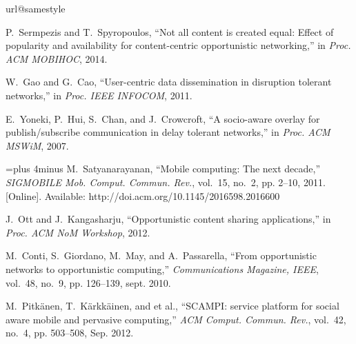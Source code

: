 \documentclass[journal]{IEEEtran}
\begin{document}
\begin{thebibliography}{10}
\providecommand{\url}[1]{#1}
\csname url@samestyle\endcsname
\providecommand{\newblock}{\relax}
\providecommand{\bibinfo}[2]{#2}
\providecommand{\BIBentrySTDinterwordspacing}{\spaceskip=0pt\relax}
\providecommand{\BIBentryALTinterwordstretchfactor}{4}
\providecommand{\BIBentryALTinterwordspacing}{\spaceskip=\fontdimen2\font plus
\BIBentryALTinterwordstretchfactor\fontdimen3\font minus
  \fontdimen4\font\relax}
\providecommand{\BIBforeignlanguage}[2]{{\expandafter\ifx\csname l@#1\endcsname\relax
\typeout{** WARNING: IEEEtran.bst: No hyphenation pattern has been}\typeout{** loaded for the language `#1'. Using the pattern for}\typeout{** the default language instead.}\else
\language=\csname l@#1\endcsname
\fi
#2}}
\providecommand{\BIBdecl}{\relax}
\BIBdecl

P.~Sermpezis and T.~Spyropoulos, ``{N}ot all content is created equal: {E}ffect
  of popularity and availability for content-centric opportunistic
  networking,'' in \emph{Proc. ACM MOBIHOC}, 2014.

W.~Gao and G.~Cao, ``User-centric data dissemination in disruption tolerant
  networks,'' in \emph{Proc. IEEE INFOCOM}, 2011.

E.~Yoneki, P.~Hui, S.~Chan, and J.~Crowcroft, ``A socio-aware overlay for
  publish/subscribe communication in delay tolerant networks,'' in \emph{Proc.
  ACM MSWiM}, 2007.

\BIBentryALTinterwordspacing
M.~Satyanarayanan, ``Mobile computing: The next decade,'' \emph{SIGMOBILE Mob.
  Comput. Commun. Rev.}, vol.~15, no.~2, pp. 2--10, 2011. [Online]. Available:
  \url{http://doi.acm.org/10.1145/2016598.2016600}
\BIBentrySTDinterwordspacing

J.~Ott and J.~Kangasharju, ``Opportunistic content sharing applications,'' in
  \emph{Proc. ACM NoM Workshop}, 2012.

M.~Conti, S.~Giordano, M.~May, and A.~Passarella, ``From opportunistic networks
  to opportunistic computing,'' \emph{Communications Magazine, IEEE}, vol.~48,
  no.~9, pp. 126--139, sept. 2010.

M.~Pitk{\"a}nen, T.~K{\"a}rkk{\"a}inen, and {et al.}, ``{S}{C}{A}{M}{P}{I}:
  service platform for social aware mobile and pervasive computing,'' \emph{ACM
  Comput. Commun. Rev.}, vol.~42, no.~4, pp. 503--508, Sep. 2012.


\end{thebibliography}
\end{document}
